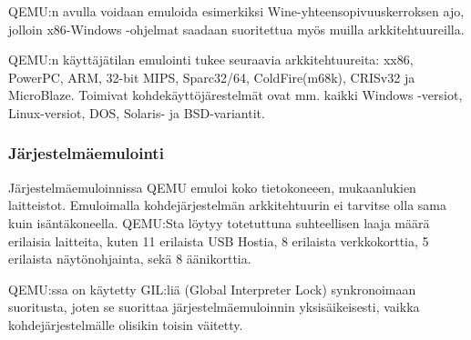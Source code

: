 QEMU:n avulla voidaan emuloida esimerkiksi Wine-yhteensopivuuskerroksen ajo, jolloin x86-Windows -ohjelmat saadaan suoritettua myös muilla arkkitehtuureilla.

QEMU:n käyttäjätilan emulointi tukee seuraavia arkkitehtuureita: xx86, PowerPC, ARM, 32-bit MIPS, Sparc32/64, ColdFire(m68k), CRISv32 ja MicroBlaze. Toimivat kohdekäyttöjärestelmät ovat mm. kaikki Windows -versiot, Linux-versiot, DOS, Solaris- ja BSD-variantit.


\subsubsection{Järjestelmäemulointi}
Järjestelmäemuloinnissa QEMU emuloi koko tietokoneeen, mukaanlukien laitteistot. Emuloimalla kohdejärjestelmän arkkitehtuurin ei tarvitse olla sama kuin isäntäkoneella. QEMU:Sta löytyy totetuttuna suhteellisen laaja määrä erilaisia laitteita, kuten 11 erilaista USB Hostia, 8 erilaista verkkokorttia, 5 erilaista näytönohjainta, sekä 8 äänikorttia.

QEMU:ssa on käytetty GIL:liä (Global Interpreter Lock) synkronoimaan suoritusta, joten se suorittaa järjestelmäemuloinnin yksisäikeisesti, vaikka kohdejärjestelmälle olisikin toisin väitetty.






